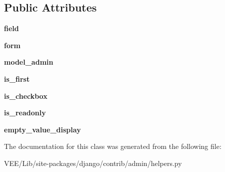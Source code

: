 \subsection*{Public Attributes}
\begin{DoxyCompactItemize}
\item 
\mbox{\label{classdjango_1_1contrib_1_1admin_1_1helpers_1_1_admin_readonly_field_a88e0cd3e0bdc8089a83224c26e98a8d4}} 
{\bfseries field}
\item 
\mbox{\label{classdjango_1_1contrib_1_1admin_1_1helpers_1_1_admin_readonly_field_a4bdcfd196dafa6a5317af47d29655e81}} 
{\bfseries form}
\item 
\mbox{\label{classdjango_1_1contrib_1_1admin_1_1helpers_1_1_admin_readonly_field_ab6992f82c4dd92330af2b8fae3a6f3ee}} 
{\bfseries model\+\_\+admin}
\item 
\mbox{\label{classdjango_1_1contrib_1_1admin_1_1helpers_1_1_admin_readonly_field_a1d80d81434e74a619ee1185e258b7d7f}} 
{\bfseries is\+\_\+first}
\item 
\mbox{\label{classdjango_1_1contrib_1_1admin_1_1helpers_1_1_admin_readonly_field_ab7571c1c45d1ddc739082c0c9ecd7db7}} 
{\bfseries is\+\_\+checkbox}
\item 
\mbox{\label{classdjango_1_1contrib_1_1admin_1_1helpers_1_1_admin_readonly_field_aa6b294bd4f2841b19629d976f0aee32a}} 
{\bfseries is\+\_\+readonly}
\item 
\mbox{\label{classdjango_1_1contrib_1_1admin_1_1helpers_1_1_admin_readonly_field_a2a63a60c77fdedeb4dbd9be38d2e9073}} 
{\bfseries empty\+\_\+value\+\_\+display}
\end{DoxyCompactItemize}


The documentation for this class was generated from the following file\+:\begin{DoxyCompactItemize}
\item 
V\+E\+E/\+Lib/site-\/packages/django/contrib/admin/helpers.\+py\end{DoxyCompactItemize}
